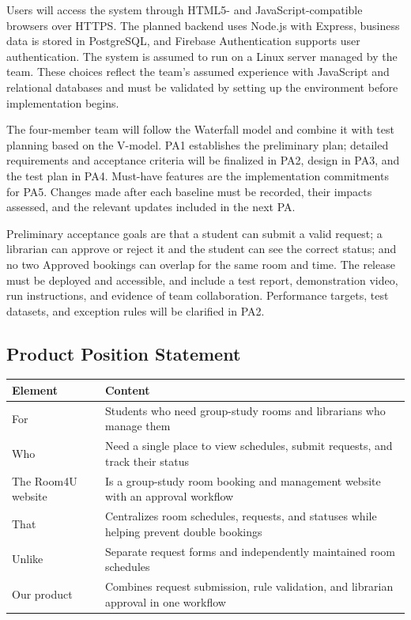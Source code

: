 Users will access the system through HTML5- and JavaScript-compatible browsers over HTTPS. The planned backend uses Node.js with Express, business data is stored in PostgreSQL, and Firebase Authentication supports user authentication. The system is assumed to run on a Linux server managed by the team. These choices reflect the team's assumed experience with JavaScript and relational databases and must be validated by setting up the environment before implementation begins.

The four-member team will follow the Waterfall model and combine it with test planning based on the V-model. PA1 establishes the preliminary plan; detailed requirements and acceptance criteria will be finalized in PA2, design in PA3, and the test plan in PA4. Must-have features are the implementation commitments for PA5. Changes made after each baseline must be recorded, their impacts assessed, and the relevant updates included in the next PA.

Preliminary acceptance goals are that a student can submit a valid request; a librarian can approve or reject it and the student can see the correct status; and no two Approved bookings can overlap for the same room and time. The release must be deployed and accessible, and include a test report, demonstration video, run instructions, and evidence of team collaboration. Performance targets, test datasets, and exception rules will be clarified in PA2.

\subsection{Product Position Statement}
\begin{tabularx}{\textwidth}{@{}L{0.28\textwidth}Y@{}}
\toprule
Element & Content \\
\midrule
For & Students who need group-study rooms and librarians who manage them \\
Who & Need a single place to view schedules, submit requests, and track their status \\
The Room4U website & Is a group-study room booking and management website with an approval workflow \\
That & Centralizes room schedules, requests, and statuses while helping prevent double bookings \\
Unlike & Separate request forms and independently maintained room schedules \\
Our product & Combines request submission, rule validation, and librarian approval in one workflow \\
\bottomrule
\end{tabularx}

